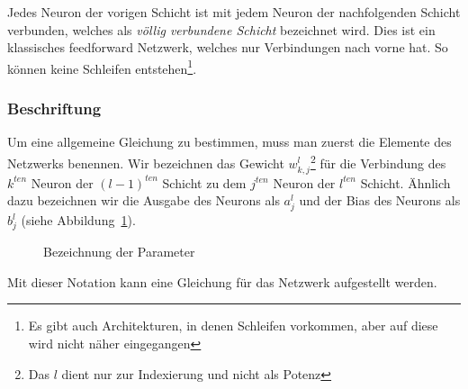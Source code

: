 \documentclass[12pt,a4paper]{report}
\begin{document}
Jedes Neuron der vorigen Schicht ist mit jedem Neuron der nachfolgenden Schicht verbunden,
welches als \textit{völlig verbundene Schicht} bezeichnet wird.
Dies ist ein klassisches feedforward Netzwerk,
welches nur Verbindungen nach vorne hat. So können keine Schleifen entstehen\footnote{Es gibt auch Architekturen, in denen Schleifen vorkommen,
aber auf diese wird nicht näher eingegangen}.

\subsubsection{Beschriftung}

Um eine allgemeine Gleichung zu bestimmen, muss man zuerst die Elemente des Netzwerks benennen.
Wir bezeichnen das Gewicht $w^l_{k,j}$\footnote{Das $l$ dient nur zur Indexierung und nicht als Potenz} für die Verbindung des $k^{ten}$ Neuron der $(l-1)^{ten}$ Schicht
zu dem $j^{ten}$ Neuron der $l^{ten}$ Schicht.
Ähnlich dazu bezeichnen wir die Ausgabe des Neurons als $a^l_j$ und der Bias des Neurons als $b^l_j$ (siehe Abbildung~\ref{fig:network3}).

\begin{figure}[h]
    \centering
{}
    \caption{Bezeichnung der Parameter}
    \label{fig:network3}
\end{figure}
Mit dieser Notation kann eine Gleichung für das Netzwerk aufgestellt werden.
\end{document}
